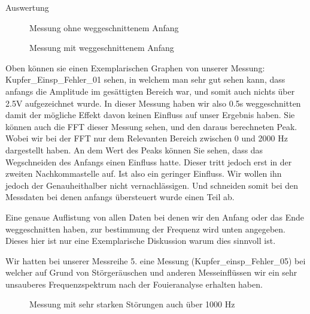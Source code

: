 \documentclass[twoside]{protokoll}
\begin{document}
\begin{aufgabe}{Auswertung}
\begin{figure}[H]
  \centering
  \caption{Messung ohne weggeschnittenem Anfang}
  \hfill
\end{figure}

\begin{figure}[H]
  \centering
  \caption{Messung mit weggeschnittenem Anfang}
  \hfill
\end{figure}

Oben können sie einen Exemplarischen Graphen von unserer Messung: Kupfer\_Einsp\_Fehler\_01 sehen, in welchem man sehr gut sehen kann, dass anfangs die Amplitude im gesättigten Bereich war, und somit auch nichts über 2.5V aufgezeichnet wurde.
In dieser Messung haben wir also 0.5s weggeschnitten damit der mögliche Effekt davon keinen Einfluss auf unser Ergebnis haben.
Sie können auch die FFT dieser Messung sehen, und den daraus berechneten Peak.
Wobei wir bei der FFT nur dem Relevanten Bereich zwischen 0 und 2000 Hz dargestellt haben.
An dem Wert des Peaks können Sie sehen, dass das Wegschneiden des Anfangs einen Einfluss hatte.
Dieser tritt jedoch erst in der zweiten Nachkommastelle auf.
Ist also ein geringer Einfluss.
Wir wollen ihn jedoch der Genauheithalber nicht vernachlässigen.
Und schneiden somit bei den Messdaten bei denen anfangs übersteuert wurde einen Teil ab. 


Eine genaue Auflistung von allen Daten bei denen wir den Anfang oder das Ende weggeschnitten haben, zur bestimmung der Frequenz wird unten angegeben.
Dieses hier ist nur eine Exemplarische Diskussion warum dies sinnvoll ist.

Wir hatten bei unserer Messreihe 5. eine Messung (Kupfer\_einsp\_Fehler\_05) bei welcher auf Grund von Störgeräuschen und anderen Messeinflüssen wir ein sehr unsauberes Frequenzspektrum nach der Fouieranalyse erhalten haben.
\begin{figure}[H]
  \centering
    \caption{Messung mit sehr starken Störungen auch über 1000 Hz}
  \hfill
\end{figure}


\end{aufgabe}
\end{document}
